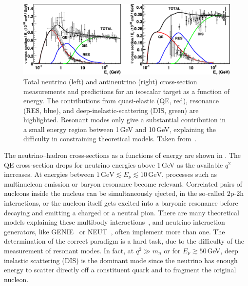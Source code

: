\begin{figure}
	\centering
	\includegraphics[width=\textwidth]{pics/qe_xsec.pdf}
	\caption[Neutrino--nucleus cross-sections at high neutrino energies]%
	{Total neutrino (left) and antineutrino (right) cross-section measurements and predictions for an isoscalar target %
	as a function of energy. The contributions from quasi-elastic (QE, red), resonance (RES, blue), %
	and deep-inelastic-scattering (DIS, green) are highlighted.
	Resonant modes only give a substantial contribution in a small energy region between 1\,GeV and 10\,GeV, %
	explaining the difficulty in constraining theoretical models.
	Taken from~.}
	\label{fig:xsec}
\end{figure}

The neutrino--hadron cross-sections as a functions of energy are shown in .
The QE cross-section drops for neutrino energies above 1\,GeV as the available $q^2$ increases. 
At energies between $1\,\text{GeV} \lesssim E_\nu \lesssim 10\,\text{GeV}$, %
processes such as multinucleon emission or baryon resonance become relevant.
Correlated pairs of nucleons inside the nucleus can be simultaneously ejected, in the so-called 2p-2h interactions, %
or the nucleon itself gets excited into a baryonic resonance before decaying and emitting a charged or a neutral pion.
There are many theoretical models explaining these multibody interactions~\cite{Rein:1980wg, Martini:2009uj, Nieves:2011pp}, %
and neutrino interaction generators, like GENIE~\cite{Andreopoulos:2009rq} or NEUT~\cite{Hayato:2002sd}, %
often implement more than one.
The determination of the correct paradigm is a hard task, due to the difficulty of the measurement of resonant modes.
In fact, at $q^2 \gg m_n$ or for $E_\nu \gtrsim 50$\,GeV, deep inelastic scattering (DIS) is the dominant mode since %
the neutrino has enough energy to scatter directly off a constituent quark and to fragment the original nucleon.
